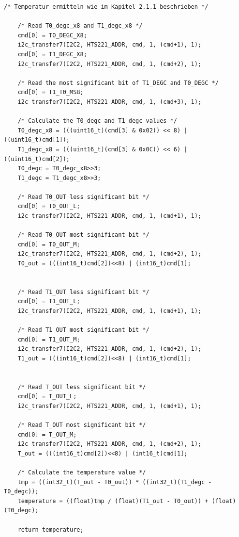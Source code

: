 \begin{lstlisting}[frame=single]
	/* Temperatur ermitteln wie im Kapitel 2.1.1 beschrieben */

	/* Read T0_degc_x8 and T1_degc_x8 */
	cmd[0] = TO_DEGC_X8;
	i2c_transfer7(I2C2, HTS221_ADDR, cmd, 1, (cmd+1), 1);
	cmd[0] = T1_DEGC_X8;
	i2c_transfer7(I2C2, HTS221_ADDR, cmd, 1, (cmd+2), 1);

	/* Read the most significant bit of T1_DEGC and T0_DEGC */
	cmd[0] = T1_T0_MSB;
	i2c_transfer7(I2C2, HTS221_ADDR, cmd, 1, (cmd+3), 1);

	/* Calculate the T0_degc and T1_degc values */
	T0_degc_x8 = (((uint16_t)(cmd[3] & 0x02)) << 8) | ((uint16_t)cmd[1]);
	T1_degc_x8 = (((uint16_t)(cmd[3] & 0x0C)) << 6) | ((uint16_t)cmd[2]);
	T0_degc = T0_degc_x8>>3;
	T1_degc = T1_degc_x8>>3;

	/* Read T0_OUT less significant bit */
	cmd[0] = T0_OUT_L;
	i2c_transfer7(I2C2, HTS221_ADDR, cmd, 1, (cmd+1), 1);

	/* Read T0_OUT most significant bit */
	cmd[0] = T0_OUT_M;
	i2c_transfer7(I2C2, HTS221_ADDR, cmd, 1, (cmd+2), 1);
	T0_out = (((int16_t)cmd[2])<<8) | (int16_t)cmd[1];


	/* Read T1_OUT less significant bit */
	cmd[0] = T1_OUT_L;
	i2c_transfer7(I2C2, HTS221_ADDR, cmd, 1, (cmd+1), 1);

	/* Read T1_OUT most significant bit */
	cmd[0] = T1_OUT_M;
	i2c_transfer7(I2C2, HTS221_ADDR, cmd, 1, (cmd+2), 1);
	T1_out = (((int16_t)cmd[2])<<8) | (int16_t)cmd[1];


	/* Read T_OUT less significant bit */
	cmd[0] = T_OUT_L;
	i2c_transfer7(I2C2, HTS221_ADDR, cmd, 1, (cmd+1), 1);

	/* Read T_OUT most significant bit */
	cmd[0] = T_OUT_M;
	i2c_transfer7(I2C2, HTS221_ADDR, cmd, 1, (cmd+2), 1);
	T_out = (((int16_t)cmd[2])<<8) | (int16_t)cmd[1];

	/* Calculate the temperature value */
	tmp = ((int32_t)(T_out - T0_out)) * ((int32_t)(T1_degc - T0_degc));
	temperature = ((float)tmp / (float)(T1_out - T0_out)) + (float)(T0_degc);

	return temperature;
\end{lstlisting}  


